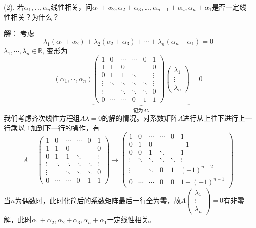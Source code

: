 (2). 若$\alpha_1, \ldots, \alpha_n$线性相关，问$\alpha_1 + \alpha_2, \alpha_2 + \alpha_3, \ldots, \alpha_{n-1} + \alpha_n, \alpha_n + \alpha_1$是否一定线性相关？为什么？

\newpageorvspace

{\bf 解}： 考虑
$$\lambda_1 (\alpha_1+\alpha_2) + \lambda_2 (\alpha_2+\alpha_3) + \cdots + \lambda_n (\alpha_n+\alpha_1) = 0$$
$\lambda_1, \cdots, \lambda_n\in\mathbb{R}$, 变形为
$$(\alpha_1, \cdots, \alpha_n)
\underbrace{\begin{pmatrix}
1 & 0 & \cdots & \cdots & 0 & 1 \\
1 & 1 & 0 & & & 0 \\
0 & 1 & 1 & \ddots & & \vdots \\
\vdots & \ddots & \ddots & \ddots & \ddots & \vdots \\
\vdots & & \ddots & \ddots & \ddots & 0 \\
0 & \cdots & \cdots & 0 & 1 & 1
\end{pmatrix}
\begin{pmatrix}
\lambda_1 \\ \vdots \\ \lambda_n
\end{pmatrix}
}_{\text{记为} A \lambda}= 0
$$
我们考虑齐次线性方程组$A\lambda = 0$的解的情况。对系数矩阵$A$进行从上往下进行上一行乘以-1加到下一行的操作，有
$$
A = \begin{pmatrix}
1 & 0 & \cdots & \cdots & 0 & 1 \\
1 & 1 & 0 & & & 0 \\
0 & 1 & 1 & \ddots & & \vdots \\
\vdots & \ddots & \ddots & \ddots & \ddots & \vdots \\
\vdots & & \ddots & \ddots & \ddots & 0 \\
0 & \cdots & \cdots & 0 & 1 & 1
\end{pmatrix}
\to
\begin{pmatrix}
1 & 0 & \cdots & \cdots & 0 & 1 \\
0 & 1 & 0 & & & -1 \\
0 & 0 & 1 & \ddots & & 1 \\
\vdots & \ddots & \ddots & \ddots & \ddots & \vdots \\
\vdots & & \ddots & 0 & 1 & (-1)^{n-2} \\
0 & \cdots & \cdots & 0 & 0 & 1 + (-1)^{n-1}
\end{pmatrix}
$$
当$n$为偶数时，此时化简后的系数矩阵最后一行全为零，故$A\begin{pmatrix}
\lambda_1 \\ \vdots \\ \lambda_n
\end{pmatrix} = 0$有非零解，此时$\alpha_1+\alpha_2, \alpha_2+\alpha_3, \alpha_n+\alpha_1$一定线性相关。

